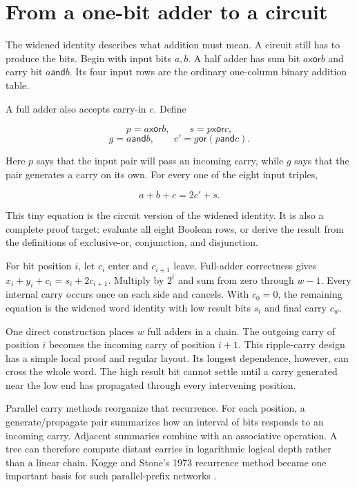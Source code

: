 \section{From a one-bit adder to a circuit}

The widened identity describes what addition must mean. A circuit still has to
produce the bits. Begin with input bits \(a,b\). A half adder has sum bit
\(a\mathbin{\mathsf{xor}}b\) and carry bit
\(a\mathbin{\mathsf{and}}b\). Its four input rows are the ordinary one-column
binary addition table.

A full adder also accepts carry-in \(c\). Define

\[
  p=a\mathbin{\mathsf{xor}}b,
  \qquad
  s=p\mathbin{\mathsf{xor}}c,
\]
\[
  g=a\mathbin{\mathsf{and}}b,
  \qquad
  c'=g\mathbin{\mathsf{or}}(p\mathbin{\mathsf{and}}c).
\]

Here \(p\) says that the input pair will pass an incoming carry, while \(g\)
says that the pair generates a carry on its own. For every one of the eight
input triples,

\[
  a+b+c=2c'+s.
\]

This tiny equation is the circuit version of the widened identity. It is also
a complete proof target: evaluate all eight Boolean rows, or derive the result
from the definitions of exclusive-or, conjunction, and disjunction.

\begin{proofkit}[title={Full-adder correctness composes by place value}]
For bit position \(i\), let \(c_i\) enter and \(c_{i+1}\) leave. Full-adder
correctness gives
\(x_i+y_i+c_i=s_i+2c_{i+1}\). Multiply by \(2^i\) and sum from zero through
\(w-1\). Every internal carry occurs once on each side and cancels. With
\(c_0=0\), the remaining equation is the widened word identity with low result
bits \(s_i\) and final carry \(c_w\).
\end{proofkit}

One direct construction places \(w\) full adders in a chain. The outgoing carry
of position \(i\) becomes the incoming carry of position \(i+1\). This ripple-carry
design has a simple local proof and regular layout. Its longest dependence,
however, can cross the whole word. The high result bit cannot settle until a
carry generated near the low end has propagated through every intervening
position.

Parallel carry methods reorganize that recurrence. For each position, a
generate/propagate pair summarizes how an interval of bits responds to an
incoming carry. Adjacent summaries combine with an associative operation. A
tree can therefore compute distant carries in logarithmic logical depth rather
than a linear chain. Kogge and Stone's 1973 recurrence method became one
important basis for such parallel-prefix networks
\autocite{koggestone1973parallel}.

